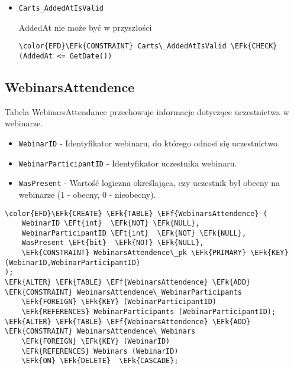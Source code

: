 \documentclass[11pt]{article}
\newcommand{\EFk}[1]{\textcolor{EFk}{\textbf{#1}}} %
\newcommand{\EFf}[1]{\textcolor{EFf}{#1}} %
\newcommand{\EFt}[1]{\textcolor{EFt}{\textbf{#1}}} %
\begin{document}
\begin{itemize}
\item \texttt{Carts\_AddedAtIsValid}

AddedAt nie może być w przyszłości
\begin{Code}
\begin{Verbatim}
\color{EFD}\EFk{CONSTRAINT} Carts\_AddedAtIsValid \EFk{CHECK}
(AddedAt <= GetDate())
\end{Verbatim}
\end{Code}
\end{itemize}
\subsection{WebinarsAttendence}
\label{sec:org0d027c1}
Tabela WebinarsAttendance przechowuje informacje dotyczące uczestnictwa w webinarze.
\begin{itemize}
\item \texttt{WebinarID} - Identyfikator webinaru, do którego odnosi się uczestnictwo.
\item \texttt{WebinarParticipantID} - Identyfikator uczestnika webinaru.
\item \texttt{WasPresent} - Wartość logiczna określająca, czy uczestnik był obecny na webinarze (1 - obecny, 0 - nieobecny).
\end{itemize}
\begin{Code}
\begin{Verbatim}
\color{EFD}\EFk{CREATE} \EFk{TABLE} \EFf{WebinarsAttendence} (
    WebinarID \EFt{int}  \EFk{NOT} \EFk{NULL},
    WebinarParticipantID \EFt{int}  \EFk{NOT} \EFk{NULL},
    WasPresent \EFt{bit}  \EFk{NOT} \EFk{NULL},
    \EFk{CONSTRAINT} WebinarsAttendence\_pk \EFk{PRIMARY} \EFk{KEY}  (WebinarID,WebinarParticipantID)
);
\EFk{ALTER} \EFk{TABLE} \EFf{WebinarsAttendence} \EFk{ADD} \EFk{CONSTRAINT} WebinarsAttendence\_WebinarParticipants
    \EFk{FOREIGN} \EFk{KEY} (WebinarParticipantID)
    \EFk{REFERENCES} WebinarParticipants (WebinarParticipantID);
\EFk{ALTER} \EFk{TABLE} \EFf{WebinarsAttendence} \EFk{ADD} \EFk{CONSTRAINT} WebinarsAttendence\_Webinars
    \EFk{FOREIGN} \EFk{KEY} (WebinarID)
    \EFk{REFERENCES} Webinars (WebinarID)
    \EFk{ON} \EFk{DELETE}  \EFk{CASCADE};
\end{Verbatim}
\end{Code}
\end{document}
